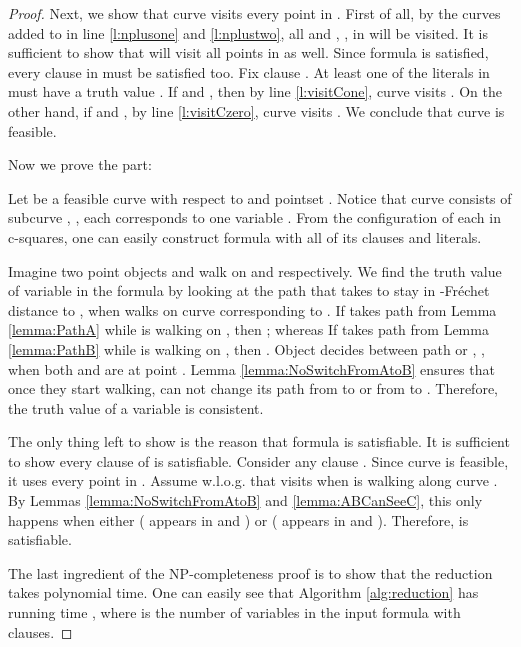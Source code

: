 \documentclass[a4paper,UKenglish]{lipics}
\newcommand{\Frechet}{Fr\'echet }
\begin{document}
\begin{proof}
Next, we show that curve  visits every point in . First of 
all, by the curves added to  
in line \ref{l:nplusone} and \ref{l:nplustwo}, 
all  and , , in  will be visited. 
It is sufficient to show that  will visit all  points in   as well.
Since  formula  is satisfied, every clause  in  must be satisfied 
too. Fix clause . At least one of the literals in 
must have a truth value . If  and , 
then by line \ref{l:visitCone}, curve  visits .
On the other hand, if  and , 
by line \ref{l:visitCzero}, curve  visits . We conclude that 
curve  is feasible.
 

Now we prove the  part:

Let  be a feasible curve with respect to  and pointset .
Notice that curve  consists of  subcurve , 
, each corresponds to one variable . 
From the configuration of each  in c-squares, 
one can easily construct formula  with 
all of its clauses and literals. 


 
Imagine two point objects  
and  walk on  and  respectively. 
We find the truth value of variable  in the formula
by looking at the path that  takes to stay in -\Frechet distance to , 
when  walks on curve  corresponding to .
If  takes path  from Lemma \ref{lemma:PathA} 
while  is walking on  , then ; 
whereas If  takes path  from Lemma \ref{lemma:PathB} 
while  is walking on  , then . 
Object  decides between path  or , 
, when both  and  are at point . 
Lemma \ref{lemma:NoSwitchFromAtoB} ensures that  
once they start walking, 
 can not change its path from  to  
or from  to . 
Therefore, the truth value of a variable  is consistent.


The only thing left to show is the reason that formula  is satisfiable. 
It is sufficient to show every clause of  is satisfiable. 
Consider any clause .
Since curve  is feasible, 
it uses every point in .  
Assume w.l.o.g. that  visits  
when  is walking along curve .  
By Lemmas 
\ref{lemma:NoSwitchFromAtoB} and \ref{lemma:ABCanSeeC},
this only happens when either ( appears in  and )
or ( appears in  and ). 
Therefore,  is satisfiable.












 

The last ingredient of the NP-completeness proof is
to show that the reduction takes polynomial time.  
One can easily see that Algorithm \ref{alg:reduction}
has running time , 
where  is the number of variables in 
the input formula with  clauses.






\end{proof}
\end{document}

